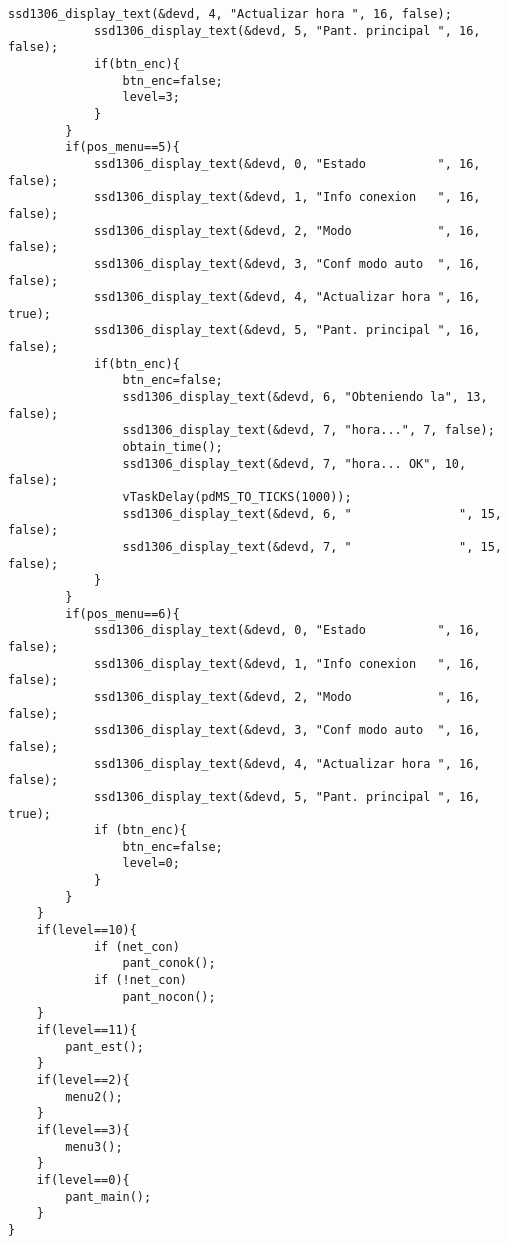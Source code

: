 \begin{lstlisting}[caption={Código del menú principal.}, label={lst:Ejemplo menu}]
			ssd1306_display_text(&devd, 4, "Actualizar hora ", 16, false);
			ssd1306_display_text(&devd, 5, "Pant. principal ", 16, false);	
			if(btn_enc){
				btn_enc=false;
				level=3;
			}
		}
		if(pos_menu==5){
			ssd1306_display_text(&devd, 0, "Estado          ", 16, false);
			ssd1306_display_text(&devd, 1, "Info conexion   ", 16, false);
			ssd1306_display_text(&devd, 2, "Modo            ", 16, false);
			ssd1306_display_text(&devd, 3, "Conf modo auto  ", 16, false);
			ssd1306_display_text(&devd, 4, "Actualizar hora ", 16, true);
			ssd1306_display_text(&devd, 5, "Pant. principal ", 16, false);
			if(btn_enc){
				btn_enc=false;
				ssd1306_display_text(&devd, 6, "Obteniendo la", 13, false);
    			ssd1306_display_text(&devd, 7, "hora...", 7, false);
				obtain_time();
				ssd1306_display_text(&devd, 7, "hora... OK", 10, false);
				vTaskDelay(pdMS_TO_TICKS(1000));
				ssd1306_display_text(&devd, 6, "               ", 15, false);
				ssd1306_display_text(&devd, 7, "               ", 15, false);
			}
		}
		if(pos_menu==6){
			ssd1306_display_text(&devd, 0, "Estado          ", 16, false);
			ssd1306_display_text(&devd, 1, "Info conexion   ", 16, false);
			ssd1306_display_text(&devd, 2, "Modo            ", 16, false);
			ssd1306_display_text(&devd, 3, "Conf modo auto  ", 16, false);
			ssd1306_display_text(&devd, 4, "Actualizar hora ", 16, false);
			ssd1306_display_text(&devd, 5, "Pant. principal ", 16, true);
			if (btn_enc){
				btn_enc=false;
				level=0;	
			}
		}
	}
	if(level==10){
			if (net_con)
				pant_conok();
			if (!net_con)
				pant_nocon();
	}
	if(level==11){
		pant_est();
	}
	if(level==2){
		menu2();
	}
	if(level==3){
		menu3();
	}
	if(level==0){
		pant_main();
	}
}
\end{lstlisting}